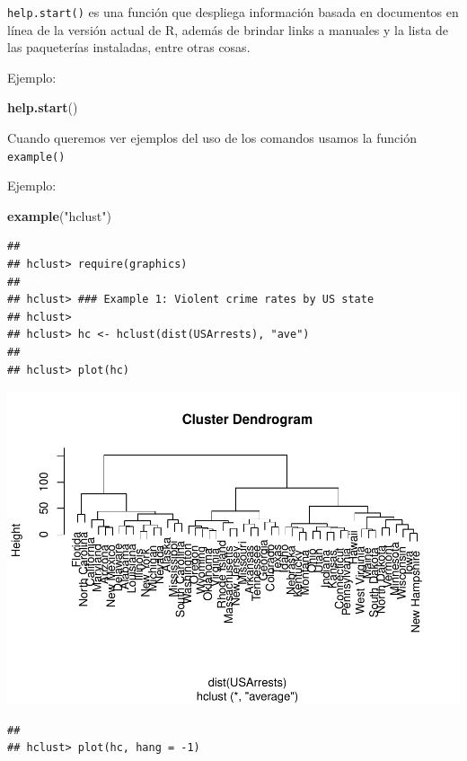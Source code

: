 \documentclass[
]{book}
\newenvironment{Shaded}{\begin{snugshade}}{\end{snugshade}}
\newcommand{\FunctionTok}[1]{\textcolor[rgb]{0.13,0.29,0.53}{\textbf{#1}}}
\newcommand{\NormalTok}[1]{#1}
\newcommand{\StringTok}[1]{\textcolor[rgb]{0.31,0.60,0.02}{#1}}
\begin{document}
\texttt{help.start()} es una función que despliega información basada en documentos en línea de la versión actual de R, además de brindar links a manuales y la lista de las paqueterías instaladas, entre otras cosas.

Ejemplo:

\begin{Shaded}
\begin{Highlighting}[]
\FunctionTok{help.start}\NormalTok{()}
\end{Highlighting}
\end{Shaded}

Cuando queremos ver ejemplos del uso de los comandos usamos la función \texttt{example()}

Ejemplo:

\begin{Shaded}
\begin{Highlighting}[]
\FunctionTok{example}\NormalTok{(}\StringTok{"hclust"}\NormalTok{)}
\end{Highlighting}
\end{Shaded}

\begin{verbatim}
## 
## hclust> require(graphics)
## 
## hclust> ### Example 1: Violent crime rates by US state
## hclust> 
## hclust> hc <- hclust(dist(USArrests), "ave")
## 
## hclust> plot(hc)
\end{verbatim}

\includegraphics{bookdown-demo_files/figure-latex/unnamed-chunk-12-1.pdf}

\begin{verbatim}
## 
## hclust> plot(hc, hang = -1)
\end{verbatim}
\end{document}
